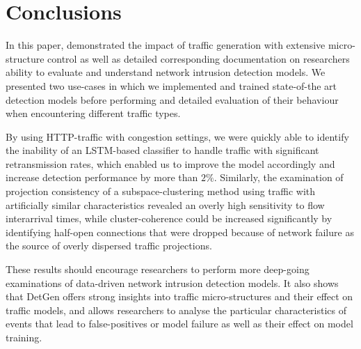 \documentclass[conference]{IEEEtran}
\begin{document}
\section{Conclusions}\label{Sec:Conclusion}

In this paper, demonstrated the impact of traffic generation with extensive micro-structure control as well as detailed corresponding documentation on researchers ability to evaluate and understand network intrusion detection models. We presented two use-cases in which we implemented and trained state-of-the art detection models before performing and detailed evaluation of their behaviour when encountering different traffic types. 

By using HTTP-traffic with congestion settings, we were quickly able to identify the inability of an LSTM-based classifier to handle traffic with significant retransmission rates, which enabled us to improve the model accordingly and increase detection performance by more than $2\%$. Similarly, the examination of projection consistency of a subspace-clustering method using traffic with artificially similar characteristics revealed an overly high sensitivity to flow interarrival times, while cluster-coherence could be increased significantly by identifying half-open connections that were dropped because of network failure as the source of overly dispersed traffic projections. 

These results should encourage researchers to perform more deep-going examinations of data-driven network intrusion detection models. It also shows that DetGen offers strong insights into traffic micro-structures and their effect on traffic models, and allows researchers to analyse the particular characteristics of events that lead to false-positives or model failure as well as their effect on model training.


\end{document}
